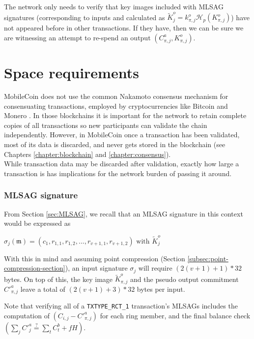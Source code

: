 The network only needs to verify that key images included with MLSAG signatures (corresponding to inputs and calculated as $\tilde{K}^o_{j} = k^o_{\pi,j} \mathcal{H}_p(K^o_{\pi,j})$) have not appeared before in other transactions. If they have, then we can be sure we are witnessing an attempt to re-spend an output $(C^a_{\pi,j}, K_{\pi,j}^o)$.



\section{Space requirements}
\label{sec:ringct-space-and-ver}

MobileCoin does not use the common Nakamoto consensus mechanism for consensuating transactions, employed by cryptocurrencies like Bitcoin \cite{Nakamoto_bitcoin} and Monero \cite{cryptoNoteWhitePaper}. In those blockchains it is important for the network to retain complete copies of all transactions so new participants can validate the chain independently. However, in MobileCoin once a transaction has been validated, most of its data is discarded, and never gets stored in the blockchain (see Chapters \ref{chapter:blockchain} and \ref{chapter:consensus}).\\

While transaction data may be discarded after validation, exactly how large a transaction is has implications for the network burden of passing it around.

\subsubsection*{MLSAG signature}

From Section \ref{sec:MLSAG}, we recall that an MLSAG signature in this context would be expressed as

\hfill \(\sigma_j(\mathfrak{m}) = (c_1, r_{1, 1}, r_{1, 2}, ..., r_{v+1, 1}, r_{v+1, 2}) \textrm{ with } \tilde{K}^o_j \) \hfill \phantom{.}

With this in mind and assuming point compression (Section \ref{subsec:point-compression-section}), an input signature $\sigma_j$ will require \( (2(v+1) + 1) * 32  \) bytes. On top of this, the key image $\tilde{K}^o_{\pi,j}$ and the pseudo output commitment $C'^a_{\pi,j}$ leave a total of $(2(v+1)+3) * 32$ bytes per input.

Note that verifying all of a {\tt TXTYPE\_RCT\_1} transaction's MLSAGs includes the computation of \( (C_{i, j} - C'^a_{\pi, j}) \) for each ring member, and the final balance check \( (\sum_j C'^a_{j} \stackrel{?}{=} \sum_t C^b_{t} + f H)\).


